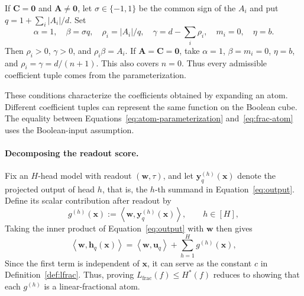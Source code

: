 \documentclass{article}
\theoremstyle{definition}
\theoremstyle{plain}
\newcommand{\hstar}{H^{\ast}}
\begin{document}
If $\mathbf{C}=\mathbf{0}$ and $\mathbf{A}\ne\mathbf{0}$, let $\sigma\in\{-1,1\}$ be the common sign of the $A_i$ and put $q=1+\sum_i|A_i|/d$. Set
\begin{equation}
\alpha=1,\quad \beta=\sigma q,\quad
\rho_i=|A_i|/q,\quad \gamma=d-\sum_i\rho_i,\quad
m_i=0,\quad \eta=b.
\end{equation}
Then $\rho_i>0$, $\gamma>0$, and $\rho_i\beta=A_i$. If $\mathbf{A}=\mathbf{C}=\mathbf{0}$, take $\alpha=1$, $\beta=m_i=0$, $\eta=b$, and $\rho_i=\gamma=d/(n+1)$. This also covers $n=0$. Thus every admissible coefficient tuple comes from the parameterization.

These conditions characterize the coefficients obtained by expanding an atom. Different coefficient tuples can represent the same function on the Boolean cube. The equality between Equations~\eqref{eq:atom-parameterization} and~\eqref{eq:frac-atom} uses the Boolean-input assumption.

\paragraph{Decomposing the readout score.}
Fix an $H$-head model with readout $(\mathbf{w},\tau)$, and let $\mathbf{y}_q^{(h)}(\mathbf{x})$ denote the projected output of head $h$, that is, the $h$-th summand in Equation~\eqref{eq:output}. Define its scalar contribution after readout by
\begin{equation}
g^{(h)}(\mathbf{x})
:=\left\langle\mathbf{w},\mathbf{y}_q^{(h)}(\mathbf{x})\right\rangle,
\qquad h\in[H],
\label{eq:normal-head-contribution}
\end{equation}
Taking the inner product of Equation~\eqref{eq:output} with $\mathbf{w}$ then gives
\begin{equation}
\left\langle\mathbf{w},\mathbf{h}_q(\mathbf{x})\right\rangle
=\left\langle\mathbf{w},\mathbf{u}_q\right\rangle
+\sum_{h=1}^{H}g^{(h)}(\mathbf{x}),
\label{eq:normal-score-decomposition}
\end{equation}
Since the first term is independent of $\mathbf{x}$, it can serve as the constant $c$ in Definition~\ref{def:lfrac}. Thus, proving $L_{\mathrm{frac}}(f)\leq\hstar(f)$ reduces to showing that each $g^{(h)}$ is a linear-fractional atom.
\end{document}
